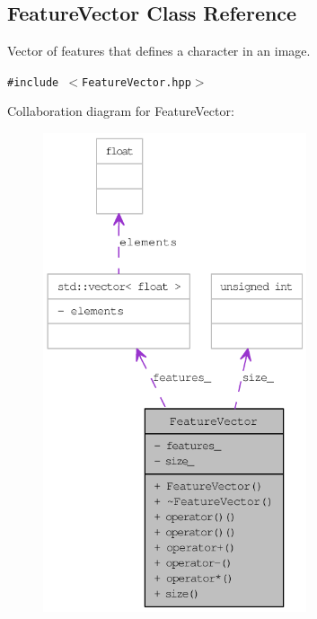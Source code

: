 \hypertarget{class_feature_vector}{
\subsection{FeatureVector Class Reference}
\label{class_feature_vector}
}
Vector of features that defines a character in an image.  


{\tt \#include $<$FeatureVector.hpp$>$}

Collaboration diagram for FeatureVector:\nopagebreak
\begin{figure}[H]
\begin{center}
\leavevmode
\includegraphics[height=400pt]{class_feature_vector__coll__graph}
\end{center}
\end{figure}
